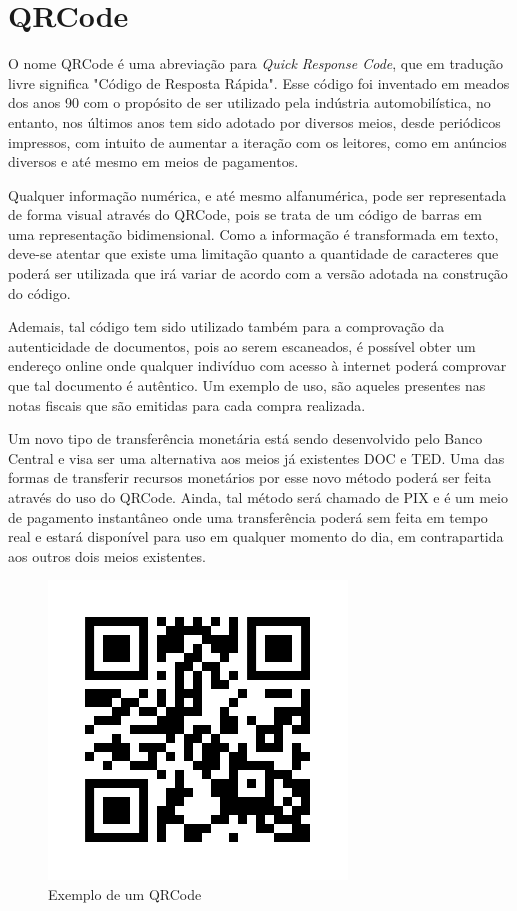 \section{QRCode}

O nome QRCode\cite{qrCodeOlharDigital} é uma abreviação para \textit{Quick Response Code}, que em tradução livre significa "Código de Resposta Rápida". Esse código foi inventado em meados dos anos 90 com o propósito de ser utilizado pela indústria automobilística, no entanto, nos últimos anos tem sido adotado por diversos meios, desde periódicos impressos, com intuito de aumentar a iteração com os leitores, como em anúncios diversos e até mesmo em meios de pagamentos.\cite{qrCodeCanalTech}

Qualquer informação numérica, e até mesmo alfanumérica, pode ser representada de forma visual através do QRCode, pois se trata de um código de barras em uma representação bidimensional. Como a informação é transformada em texto, deve-se atentar que existe uma limitação quanto a quantidade de caracteres que poderá ser utilizada que irá variar de acordo com a versão adotada na construção do código.

Ademais, tal código tem sido utilizado também para a comprovação da autenticidade de documentos, pois ao serem escaneados, é possível obter um endereço online onde qualquer indivíduo com acesso à internet poderá comprovar que tal documento é autêntico. Um exemplo de uso, são aqueles presentes nas notas fiscais que são emitidas para cada compra realizada.\cite{nfceDefinicao}

Um novo tipo de transferência monetária está sendo desenvolvido pelo Banco Central e visa ser uma alternativa aos meios já existentes DOC e TED. Uma das formas de transferir recursos monetários por esse novo método poderá ser feita através do uso do QRCode. Ainda, tal método será chamado de PIX e é um meio de pagamento instantâneo onde uma transferência poderá sem feita em tempo real e estará disponível para uso em qualquer momento do dia, em contrapartida aos outros dois meios existentes.\cite{pixDefinicao}

\begin{figure}[h]
    \centering
    \includegraphics[scale=0.5]{tcc/figures/exemplo-qrcode.png}
    \caption{Exemplo de um QRCode}
    \label{fig-exemplo-qrcode}
\end{figure}

